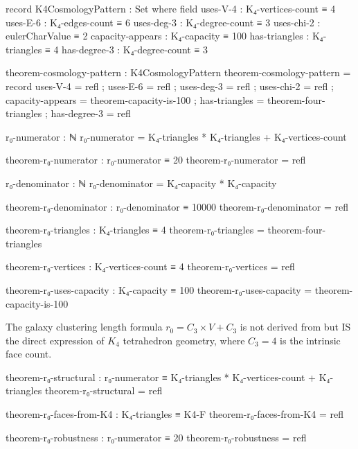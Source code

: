 \documentclass[11pt,a4paper]{book}
\begin{document}
\begin{code}
record K4CosmologyPattern : Set where
  field
    uses-V-4          : K₄-vertices-count ≡ 4
    uses-E-6          : K₄-edges-count ≡ 6
    uses-deg-3        : K₄-degree-count ≡ 3
    uses-chi-2        : eulerCharValue ≡ 2
    capacity-appears  : K₄-capacity ≡ 100
    has-triangles     : K₄-triangles ≡ 4
    has-degree-3      : K₄-degree-count ≡ 3

theorem-cosmology-pattern : K4CosmologyPattern
theorem-cosmology-pattern = record
  { uses-V-4         = refl
  ; uses-E-6         = refl
  ; uses-deg-3       = refl
  ; uses-chi-2       = refl
  ; capacity-appears = theorem-capacity-is-100
  ; has-triangles    = theorem-four-triangles
  ; has-degree-3     = refl
  }
\end{code}

\begin{code}
r₀-numerator : ℕ
r₀-numerator = K₄-triangles * K₄-triangles + K₄-vertices-count

theorem-r₀-numerator : r₀-numerator ≡ 20
theorem-r₀-numerator = refl

r₀-denominator : ℕ
r₀-denominator = K₄-capacity * K₄-capacity

theorem-r₀-denominator : r₀-denominator ≡ 10000
theorem-r₀-denominator = refl
\end{code}

\begin{code}
theorem-r₀-triangles : K₄-triangles ≡ 4
theorem-r₀-triangles = theorem-four-triangles

theorem-r₀-vertices : K₄-vertices-count ≡ 4
theorem-r₀-vertices = refl

theorem-r₀-uses-capacity : K₄-capacity ≡ 100
theorem-r₀-uses-capacity = theorem-capacity-is-100
\end{code}

The galaxy clustering length formula $r_0 = C_3 \times V + C_3$ is not derived from but IS the direct expression of $K_4$ tetrahedron geometry, where $C_3 = 4$ is the intrinsic face count.

\begin{code}
theorem-r₀-structural : r₀-numerator ≡ K₄-triangles * K₄-vertices-count + K₄-triangles
theorem-r₀-structural = refl

theorem-r₀-faces-from-K4 : K₄-triangles ≡ K4-F
theorem-r₀-faces-from-K4 = refl

theorem-r₀-robustness : r₀-numerator ≡ 20
theorem-r₀-robustness = refl
\end{code}
\end{document}
